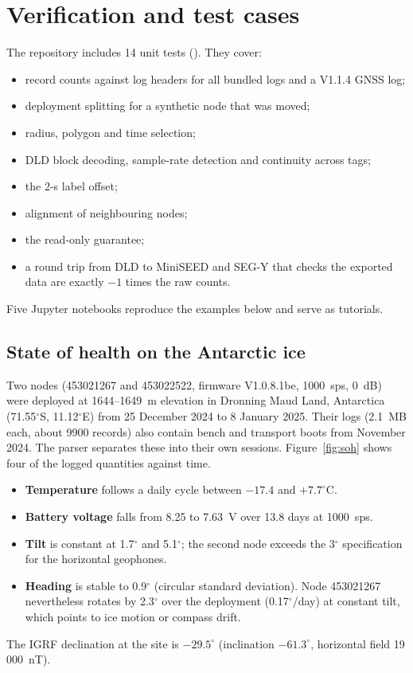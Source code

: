 \documentclass[report]{seismica}
\begin{document}
\section{Verification and test cases}

The repository includes 14 unit tests (). They cover:
\begin{itemize}
\item record counts against log headers for all bundled logs and a V1.1.4 GNSS log;
\item deployment splitting for a synthetic node that was moved;
\item radius, polygon and time selection;
\item DLD block decoding, sample-rate detection and continuity across tags;
\item the 2-s label offset;
\item alignment of neighbouring nodes;
\item the read-only guarantee;
\item a round trip from DLD to MiniSEED and SEG-Y that checks the exported data are exactly $-1$ times the raw counts.
\end{itemize}
Five Jupyter notebooks reproduce the examples below and serve as tutorials.

\subsection{State of health on the Antarctic ice}

Two nodes (453021267 and 453022522, firmware V1.0.8.1be, 1000~sps, 0~dB) were deployed at 1644--1649~m elevation in Dronning Maud Land, Antarctica (71.55$^\circ$S, 11.12$^\circ$E) from 25 December 2024 to 8 January 2025. Their logs (2.1~MB each, about 9900 records) also contain bench and transport boots from November 2024. The parser separates these into their own sessions. Figure~\ref{fig:soh} shows four of the logged quantities against time.
\begin{itemize}
\item \textbf{Temperature} follows a daily cycle between $-17.4$ and $+7.7^\circ$C.
\item \textbf{Battery voltage} falls from 8.25 to 7.63~V over 13.8 days at 1000~sps.
\item \textbf{Tilt} is constant at 1.7$^\circ$ and 5.1$^\circ$; the second node exceeds the 3$^\circ$ specification for the horizontal geophones.
\item \textbf{Heading} is stable to 0.9$^\circ$ (circular standard deviation). Node 453021267 nevertheless rotates by 2.3$^\circ$ over the deployment (0.17$^\circ$/day) at constant tilt, which points to ice motion or compass drift.
\end{itemize}
The IGRF declination at the site is $-29.5^\circ$ (inclination $-61.3^\circ$, horizontal field 19\,000~nT).
\end{document}
